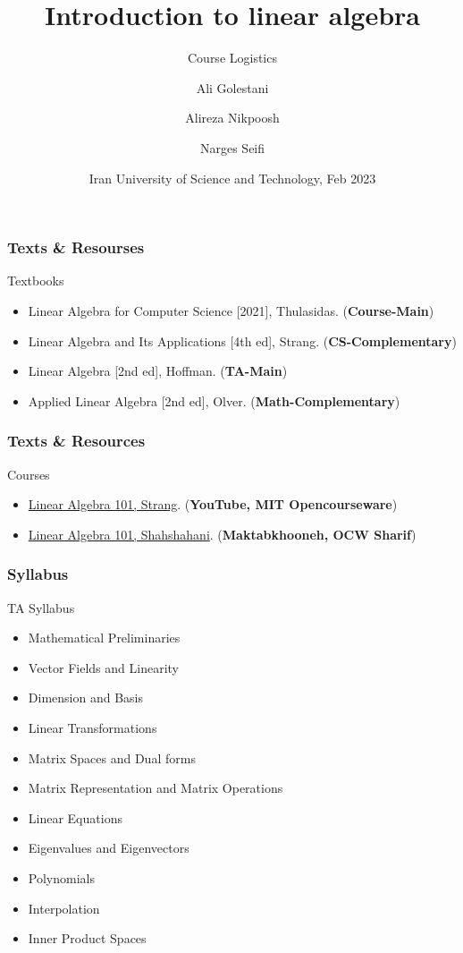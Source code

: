 \documentclass{beamer}
\title[Linear Algebra 101] %
{Introduction to linear algebra}
\subtitle{Course Logistics}
\author[Golestani, Nikpoosh, Seifi]{Ali Golestani \inst{1} \and Alireza Nikpoosh \inst{2} \and Narges Seifi \inst{3}}
\institute[IUST] %
{
  \inst{}%
  Department of Mathematics\\
  Iran University of Science and Technology
}
\date[IUST 2023] %
{Iran University of Science and Technology, Feb 2023}
\begin{document}
\frame{\titlepage}


\begin{frame}
\frametitle{Texts \& Resourses}
   \begin{block}{Textbooks}
    \begin{itemize}
      \item Linear Algebra for Computer Science [2021], Thulasidas. (\textbf{Course-Main})
      \item Linear Algebra and Its Applications [4th ed], Strang. (\textbf{CS-Complementary})
      \item Linear Algebra [2nd ed], Hoffman. (\textbf{TA-Main})
      \item Applied Linear Algebra [2nd ed], Olver. (\textbf{Math-Complementary})
    \end{itemize}
   \end{block}
\end{frame}

\begin{frame}
  \frametitle{Texts \& Resources}
     \begin{block}{Courses}
       \begin{itemize}
         \item \href{https://ocw.mit.edu/courses/18-06sc-linear-algebra-fall-2011/}{Linear Algebra 101, Strang}. (\textbf{YouTube, MIT Opencourseware})
         \item \href{https://ocw.sharif.edu/course/id/41/}{Linear Algebra 101, Shahshahani}. (\textbf{Maktabkhooneh, OCW Sharif})
       \end{itemize}
     \end{block}
  \end{frame}

\begin{frame}
  \frametitle{Syllabus}
  \begin{alertblock}{TA Syllabus}
    \begin{itemize}
      \item Mathematical Preliminaries
      \item Vector Fields and Linearity
      \item Dimension and Basis
      \item Linear Transformations
      \item Matrix Spaces and Dual forms
      \item Matrix Representation and Matrix Operations
      \item Linear Equations
      \item Eigenvalues and Eigenvectors
      \item Polynomials
      \item Interpolation
      \item Inner Product Spaces
    \end{itemize}
  \end{alertblock}
\end{frame}
\end{document}
